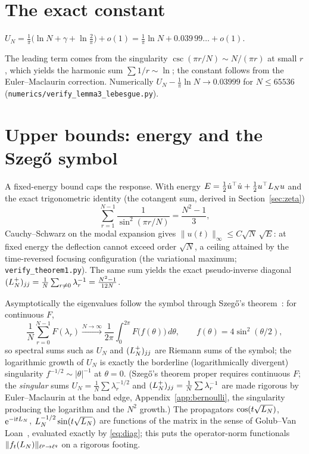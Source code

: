 \section{The exact constant}

\begin{lemma}\label{lem:asym}
$\displaystyle U_N=\frac1\pi\Big(\ln N+\gamma+\ln\frac2\pi\Big)+o(1)
   =\frac1\pi\ln N+0.039\,99\ldots+o(1).$
\end{lemma}

\noindent The leading term comes from the singularity $\csc(\pi r/N)\sim N/(\pi r)$ at small $r$,
which yields the harmonic sum $\sum 1/r\sim\ln$; the constant follows from the Euler--Maclaurin
correction. Numerically $U_N-\tfrac1\pi\ln N\to0.03999$ for $N\le 65536$
(\texttt{numerics/verify\_lemma3\_lebesgue.py}).

\section{Upper bounds: energy and the Szeg\H{o} symbol}\label{sec:upper}

A fixed-energy bound caps the response. With energy
$E=\tfrac12\dot u^\top\dot u+\tfrac12 u^\top L_N u$ and the exact trigonometric identity (the cotangent
sum, derived in Section~\ref{sec:zeta})
\begin{equation}\label{eq:csc2}
  \sum_{r=1}^{N-1}\frac1{\sin^2(\pi r/N)}=\frac{N^2-1}{3},
\end{equation}
Cauchy--Schwarz on the modal expansion gives $\|u(t)\|_\infty\le C\sqrt N\,\sqrt E$: at fixed energy
the deflection cannot exceed order $\sqrt N$, a ceiling attained by the time-reversed focusing
configuration (the variational maximum; \texttt{verify\_theorem1.py}). The same sum yields the exact
pseudo-inverse diagonal $(L_N^{+})_{jj}=\tfrac1N\sum_{r\ne0}\lambda_r^{-1}=\tfrac{N^2-1}{12N}$.

Asymptotically the eigenvalues follow the symbol through Szeg\H{o}'s theorem~\cite{GrenanderSzego,Gray}:
for continuous $F$,
\begin{equation}\label{eq:szego}
  \frac1N\sum_{r=0}^{N-1}F(\lambda_r)\xrightarrow{N\to\infty}\frac1{2\pi}\int_0^{2\pi}F\bigl(f(\theta)\bigr)\,d\theta,
  \qquad f(\theta)=4\sin^2(\theta/2),
\end{equation}
so spectral sums such as $U_N$ and $(L_N^{+})_{jj}$ are Riemann sums of the symbol; the logarithmic
growth of $U_N$ is exactly the borderline (logarithmically divergent) singularity
$f^{-1/2}\sim|\theta|^{-1}$ at $\theta=0$. (Szeg\H{o}'s theorem
proper requires continuous $F$; the \emph{singular} sums $U_N=\tfrac1N\sum\lambda_r^{-1/2}$ and
$(L_N^{+})_{jj}=\tfrac1N\sum\lambda_r^{-1}$ are made rigorous by Euler--Maclaurin at the band edge,
Appendix~\ref{app:bernoulli}, the singularity producing the logarithm and the $N^2$ growth.) The propagators
$\cos(t\sqrt{L_N})$, $\mathrm{e}^{-\mathrm i tL_N}$, $L_N^{-1/2}\sin(t\sqrt{L_N})$ are functions of the matrix
in the sense of Golub--Van Loan~\cite{GVL}, evaluated exactly by \eqref{eq:diag}; this puts the
operator-norm functionals $\|f_t(L_N)\|_{\ell^p\to\ell^q}$ on a rigorous footing.

